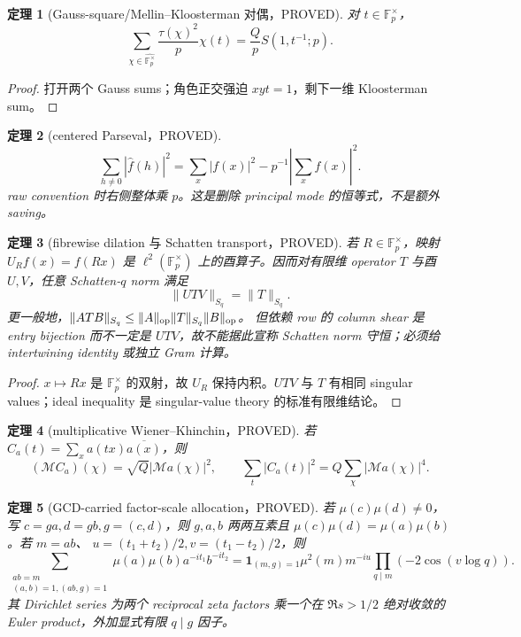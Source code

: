 \documentclass[11pt,a4paper]{ctexart}
\newtheorem{theorem}{定理}[section]
\theoremstyle{definition}
\newcommand{\1}{\mathbf 1}
\newcommand{\F}{\mathbb F}
\newcommand{\G}{\F_p^\times}
\newcommand{\Gh}{\widehat{\G}}
\newcommand{\PROVED}{\textcolor{green!40!black}{\textsf{PROVED}}}
\begin{document}
\begin{theorem}[Gauss-square/Mellin--Kloosterman 对偶，\PROVED]
对 $t\in\G$，
\[
 \sum_{\chi\in\Gh}\frac{\tau(\chi)^2}{p}\chi(t)
 =\frac Qp S(1,t^{-1};p).                            \tag{TK.6}
\]
\end{theorem}
\begin{proof}
打开两个 Gauss sums；角色正交强迫 $xyt=1$，剩下一维 Kloosterman sum。
\end{proof}

\begin{theorem}[centered Parseval，\PROVED]
\[
 \sum_{h\ne0}|\widehat f(h)|^2
 =\sum_x|f(x)|^2-p^{-1}|\sum_xf(x)|^2.               \tag{TK.7}
\]
raw convention 时右侧整体乘 $p$。这是删除 principal mode 的恒等式，不是额外 saving。
\end{theorem}

\begin{theorem}[fibrewise dilation 与 Schatten transport，\PROVED]
若 $R\in\G$，映射 $U_Rf(x)=f(Rx)$ 是 $\ell^2(\G)$ 上的酉算子。因而对有限维
operator $T$ 与酉 $U,V$，任意 Schatten-$q$ norm 满足
\[
 \|UTV\|_{S_q}=\|T\|_{S_q}.                          \tag{TK.7a}
\]
更一般地，$\|ATB\|_{S_q}\le\|A\|_{\rm op}\|T\|_{S_q}\|B\|_{\rm op}$。
但依赖 row 的 column shear 是 entry bijection 而不一定是 $UTV$，故不能据此宣称
Schatten norm 守恒；必须给 intertwining identity 或独立 Gram 计算。
\end{theorem}
\begin{proof}
$x\mapsto Rx$ 是 $\G$ 的双射，故 $U_R$ 保持内积。$UTV$ 与 $T$ 有相同 singular
values；ideal inequality 是 singular-value theory 的标准有限维结论。
\end{proof}

\begin{theorem}[multiplicative Wiener--Khinchin，\PROVED]
若 $C_a(t)=\sum_xa(tx)\overline{a(x)}$，则
\[
 (\mathcal MC_a)(\chi)=\sqrt Q|\mathcal Ma(\chi)|^2,
 \qquad \sum_t|C_a(t)|^2=Q\sum_\chi|\mathcal Ma(\chi)|^4.\tag{TK.8}
\]
\end{theorem}

\begin{theorem}[GCD-carried factor-scale allocation，\PROVED]
若 $\mu(c)\mu(d)\ne0$，写 $c=ga,d=gb,g=(c,d)$，则 $g,a,b$ 两两互素且
$\mu(c)\mu(d)=\mu(a)\mu(b)$。若 $m=ab$、
$u=(t_1+t_2)/2,v=(t_1-t_2)/2$，则
\[
 \sum_{\substack{ab=m\\(a,b)=1,(ab,g)=1}}\mu(a)\mu(b)a^{-it_1}b^{-it_2}
 =\1_{(m,g)=1}\mu^2(m)m^{-iu}\prod_{q\mid m}(-2\cos(v\log q)).\tag{TK.9}
\]
其 Dirichlet series 为两个 reciprocal zeta factors 乘一个在
$\Re s>1/2$ 绝对收敛的 Euler product，外加显式有限 $q\mid g$ 因子。
\end{theorem}
\end{document}
